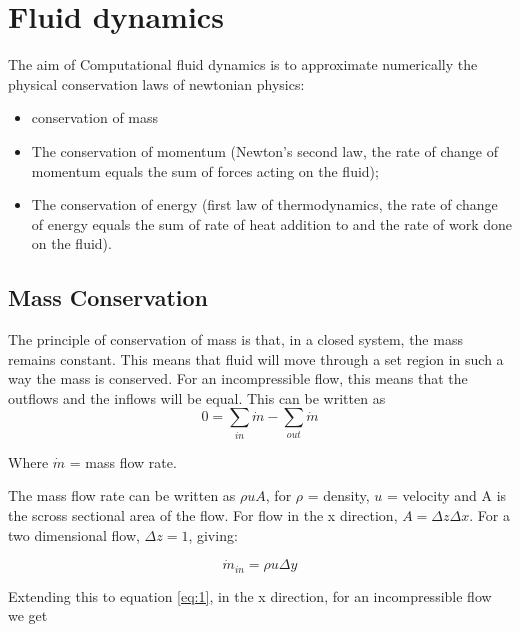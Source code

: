 \section{Fluid dynamics}
The aim of Computational fluid dynamics is to approximate numerically the physical conservation laws of newtonian physics:

\begin{itemize}

  \item conservation of mass

  \item The conservation of momentum (Newton’s second law, the rate of change of momentum equals the sum of forces acting on the fluid);

  \item The conservation of energy (first law of thermodynamics, the rate of change of energy equals the sum of rate of heat addition to and the rate of work done on the fluid).

\end{itemize}

    \subsection{Mass Conservation}

    The principle of conservation of mass is that, in a closed system, the mass remains constant. This means that fluid will move through a set region in such a way the mass is conserved. For an incompressible flow, this means that the outflows and the inflows will be equal. This can be written as
    \begin{equation} \label{eq:1}
      0 = \sum_{in} \dot{m} - \sum_{out} \dot{m}
    \end{equation} 

    Where $\dot{m}$ = mass flow rate.
    
    The mass flow rate can be written as $ \rho u A $,  for $\rho$ = density, $u$ = velocity and A is the scross sectional area of the flow. For flow in the x direction, $ A = \Delta z \Delta x $. For a two dimensional flow, $ \Delta z = 1 $, giving:

    \begin{equation} \label{eq:2}
      \dot{m}_{in} = \rho u \Delta y
    \end{equation}

    Extending this to equation \ref{eq:1}, in the x direction, for an incompressible flow we get

